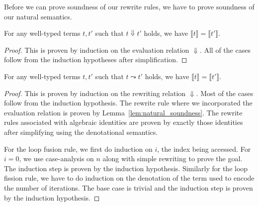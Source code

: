Before we can prove soundness of our rewrite rules, we have to prove soundness of our natural semantics.

\begin{lemma}\label{lem:natural_soundness}
  For any well-typed terms $t, t'$ such that $t \Downarrow t'$ holds, we have $\llbracket t \rrbracket = \llbracket t' \rrbracket$.
\end{lemma}
\begin{proof}
  This is proven by induction on the evaluation relation $\Downarrow$.
  All of the cases follow from the induction hypotheses after simplification.
\end{proof}

\begin{theorem}
  For any well-typed terms $t, t'$ such that $t \leadsto t'$ holds, we have $\llbracket t \rrbracket = \llbracket t' \rrbracket$.
\end{theorem}
\begin{proof}
  This is proven by induction on the rewriting relation $\Downarrow$.
  Most of the cases follow from the induction hypothesis.
  The rewrite rule where we incorporated the evaluation relation is proven by Lemma~\ref{lem:natural_soundness}.
  The rewrite rules associated with algebraic identities are proven by exactly those identities after simplifying using the denotational semantics.

  For the loop fusion rule, we first do induction on $i$, the index being accessed.
  For $i = 0$, we use case-analysis on $n$ along with simple rewriting to prove the goal. The induction step is proven by the induction hypothesis.
  Similarly for the loop fission rule, we have to do induction on the denotation of the term used to encode the number of iterations.
  The base case is trivial and the induction step is proven by the induction hypothesis.
\end{proof}